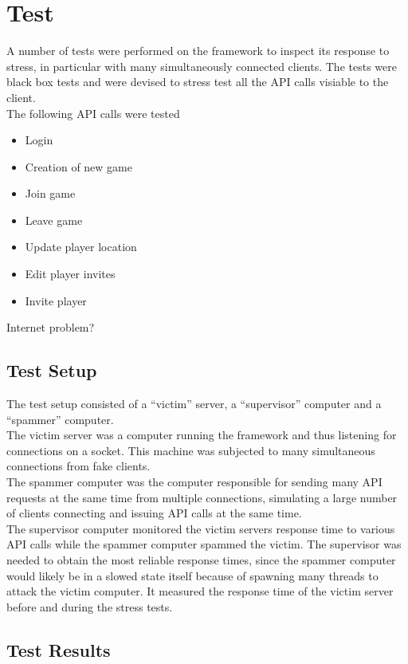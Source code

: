 \section{Test}
A number of tests were performed on the framework to inspect its response to stress, in particular with many simultaneously connected clients. The tests were black box tests and were devised to stress test all the API calls visiable to the client.\\

The following API calls were tested
\begin{itemize}
\item Login
\item Creation of new game
\item Join game
\item Leave game
\item Update player location
\item Edit player invites
\item Invite player
\end{itemize}

Internet problem?

\subsection{Test Setup}
The test setup consisted of a ``victim'' server, a ``supervisor'' computer and a ``spammer'' computer.\\

The victim server was a computer running the framework and thus listening for connections on a socket. This machine was subjected to many simultaneous connections from fake clients.\\

The spammer computer was the computer responsible for sending many API requests at the same time from multiple connections, simulating a large number of clients connecting and issuing API calls at the same time.\\

The supervisor computer monitored the victim servers response time to various API calls while the spammer computer spammed the victim. The supervisor was needed to obtain the most reliable response times, since the spammer computer would likely be in a slowed state itself because of spawning many threads to attack the victim computer. It measured the response time of the victim server before and during the stress tests.

\subsection{Test Results}
